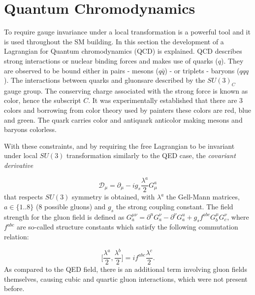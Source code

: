 \section{Quantum Chromodynamics}
\label{qcd}
To require gauge invariance under a local transformation is a powerful tool and it is used throughout the \gls{SM} building. In this section the development of a Lagrangian for Quantum chromodynamics (\gls{QCD}) is explained. \gls{QCD} describes strong interactions or nuclear binding forces and makes use of quarks ($q$). They are observed to be bound either in pairs - mesons ($q\bar{q}$) - or triplets - baryons ($qqq$). The interactions between quarks and gluons\DIFaddbegin {}\DIFaddend are described by the $SU(3)_{C}$ gauge group. The conserving charge associated with the strong force is known as color, hence the subscript $C$. It was experimentally established that there are 3 colors and borrowing from color theory used by painters these colors are red, blue and green. The quark carries color and antiquark anticolor making mesons and baryons colorless. \DIFdelbegin {}\DIFdelend %

With these constraints, and by requiring the free Lagrangian to be invariant under local $SU(3)$ transformation similarly to the \gls{QED} case, the \textit{covariant derivative}

\begin{equation}
\mathcal{D}_{\mu} = \partial_{\mu} - ig_{s}\frac{\lambda^{a}}{2}G^{a}_{\mu}
\end{equation}
 that respects $SU(3)$ symmetry is obtained, with $\lambda^{a}$ the Gell-Mann matrices, $a\in\{1..8\}$ (8 possible gluons) and $g_{s}$ the strong coupling constant. The field strength for the gluon field is defined as $G_{a}^{\mu\nu}=\partial^{u}G_{a}^{\nu} - \partial^{\nu}G_{a}^{u} + g_{s}f^{abc}G_{b}^{\mu}G_{c}^{\nu}$, where $f^{abc}$ are so-called structure constants which satisfy the following commutation relation:

\begin{equation}
	\Big[\frac{\lambda^{a}}{2},\frac{\lambda^{b}}{2}\Big] = if^{abc}\frac{\lambda^{c}}{2}.
\end{equation}
As compared to the \gls{QED} field, there is an additional term involving gluon fields themselves, causing cubic and quartic gluon interactions, which were not present before.

